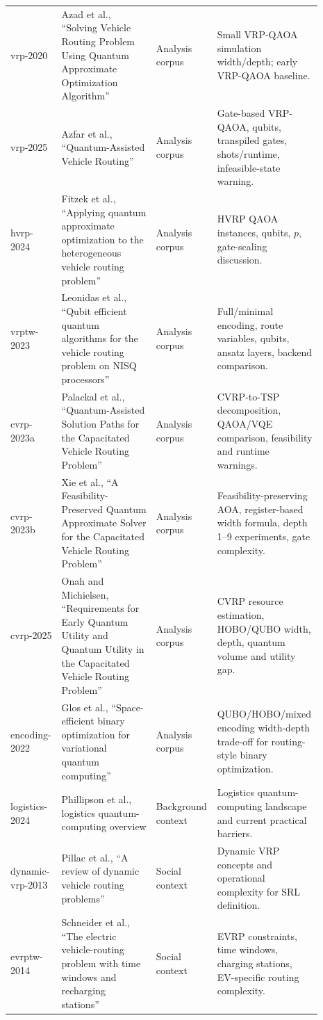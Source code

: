 \begin{longtable}{>{\raggedright\arraybackslash}p{0.15\linewidth}>{\raggedright\arraybackslash}p{0.30\linewidth}>{\raggedright\arraybackslash}p{0.17\linewidth}>{\raggedright\arraybackslash}p{0.27\linewidth}}
vrp-2020 & Azad et al., ``Solving Vehicle Routing Problem Using Quantum Approximate Optimization Algorithm'' & Analysis corpus & Small VRP-QAOA simulation width/depth; early VRP-QAOA baseline. \\
vrp-2025 & Azfar et al., ``Quantum-Assisted Vehicle Routing'' & Analysis corpus & Gate-based VRP-QAOA, qubits, transpiled gates, shots/runtime, infeasible-state warning. \\
hvrp-2024 & Fitzek et al., ``Applying quantum approximate optimization to the heterogeneous vehicle routing problem'' & Analysis corpus & HVRP QAOA instances, qubits, $p$, gate-scaling discussion. \\
vrptw-2023 & Leonidas et al., ``Qubit efficient quantum algorithms for the vehicle routing problem on NISQ processors'' & Analysis corpus & Full/minimal encoding, route variables, qubits, ansatz layers, backend comparison. \\
cvrp-2023a & Palackal et al., ``Quantum-Assisted Solution Paths for the Capacitated Vehicle Routing Problem'' & Analysis corpus & CVRP-to-TSP decomposition, QAOA/VQE comparison, feasibility and runtime warnings. \\
cvrp-2023b & Xie et al., ``A Feasibility-Preserved Quantum Approximate Solver for the Capacitated Vehicle Routing Problem'' & Analysis corpus & Feasibility-preserving AOA, register-based width formula, depth 1--9 experiments, gate complexity. \\
cvrp-2025 & Onah and Michielsen, ``Requirements for Early Quantum Utility and Quantum Utility in the Capacitated Vehicle Routing Problem'' & Analysis corpus & CVRP resource estimation, HOBO/QUBO width, depth, quantum volume and utility gap. \\
encoding-2022 & Glos et al., ``Space-efficient binary optimization for variational quantum computing'' & Analysis corpus & QUBO/HOBO/mixed encoding width-depth trade-off for routing-style binary optimization. \\
logistics-2024 & Phillipson et al., logistics quantum-computing overview & Background context & Logistics quantum-computing landscape and current practical barriers. \\
dynamic-vrp-2013 & Pillac et al., ``A review of dynamic vehicle routing problems'' & Social context & Dynamic VRP concepts and operational complexity for SRL definition. \\
evrptw-2014 & Schneider et al., ``The electric vehicle-routing problem with time windows and recharging stations'' & Social context & EVRP constraints, time windows, charging stations, EV-specific routing complexity. \\

\end{longtable}
